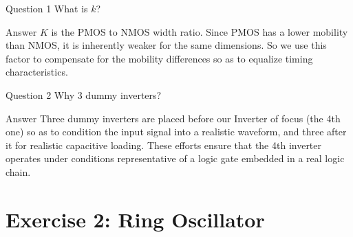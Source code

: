 \documentclass[aspectratio=169, 11pt]{beamer}
\begin{document}
\begin{frame}
    \begin{block}{Question 1}
        What is $k$?
    \end{block}
    \vspace{0.01em}
    \begin{exampleblock}{Answer}
        $K$ is the PMOS to NMOS width ratio. Since PMOS has a lower mobility than NMOS, it is inherently weaker for the same dimensions. So we use this factor to compensate for the mobility differences so as to equalize timing characteristics.
    \end{exampleblock}

    \vspace{0.01em}

    \begin{block}{Question 2}
        Why 3 dummy inverters?
    \end{block}
    \vspace{0.01em}
    \begin{exampleblock}{Answer}
        Three dummy inverters are placed before our Inverter of focus (the 4th one) so as to condition the input signal into a realistic waveform, and three after it for realistic capacitive loading. These efforts ensure that the 4th inverter operates under conditions representative of a logic gate embedded in a real logic chain.
    \end{exampleblock}
\end{frame}

\section{Exercise 2: Ring Oscillator}
\end{document}
